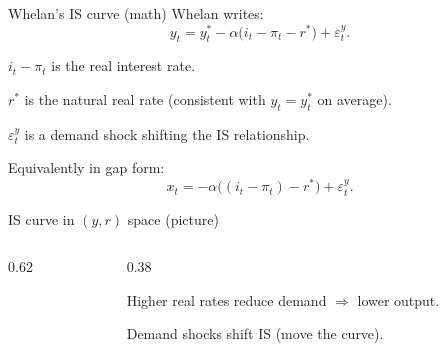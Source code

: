 \documentclass[aspectratio=169,xcolor=dvipsnames]{beamer}
\let\tempone\itemize
\let\temptwo\enditemize
\renewenvironment{itemize}{\tempone\addtolength{\itemsep}{\fill}}{\temptwo}
\begin{document}
\begin{frame}{Whelan's IS curve (math)}
\small
Whelan writes:
\[
y_t = y_t^\ast - \alpha \big(i_t-\pi_t-r^\ast\big) + \varepsilon_t^y.
\]
\begin{itemize}
\item $i_t-\pi_t$ is the real interest rate.
\item $r^\ast$ is the natural real rate (consistent with $y_t=y_t^\ast$ on average).
\item $\varepsilon_t^y$ is a demand shock shifting the IS relationship.
\end{itemize}

\vspace{0.3em}
Equivalently in gap form:
\[
x_t = -\alpha\big((i_t-\pi_t)-r^\ast\big)+\varepsilon_t^y.
\]
\end{frame}

\begin{frame}{IS curve in $(y,r)$ space (picture)}
\begin{columns}
\begin{column}{0.62\textwidth}
\centering
{}
\end{column}
\begin{column}{0.38\textwidth}
\small
\begin{itemize}
\item Higher real rates reduce demand $\Rightarrow$ lower output.
\item Demand shocks shift IS (move the curve).
\end{itemize}
\end{column}
\end{columns}
\end{frame}

\end{document}
